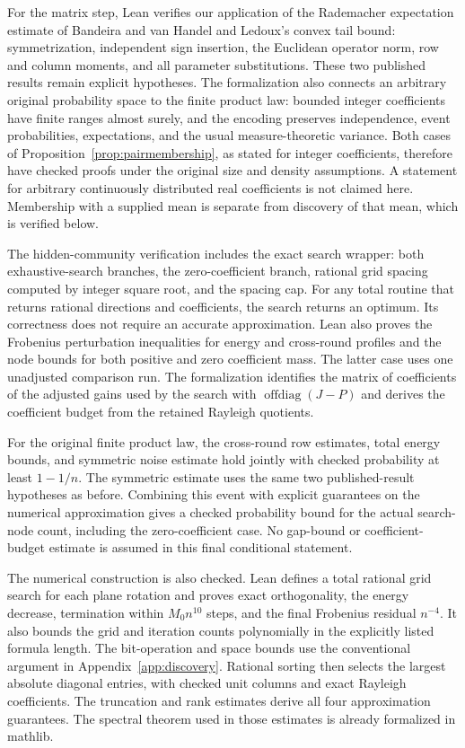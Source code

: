 \documentclass[11pt,a4paper]{article}
\theoremstyle{definition}
\theoremstyle{remark}
\begin{document}
For the matrix step, Lean verifies our application of the Rademacher
expectation estimate of Bandeira and van Handel and Ledoux's convex
tail bound: symmetrization, independent sign insertion, the Euclidean
operator norm, row and column moments, and all parameter substitutions.
These two published results remain explicit hypotheses. The formalization
also connects an arbitrary original probability space to the finite product
law: bounded integer coefficients have finite ranges almost surely, and
the encoding preserves independence, event probabilities, expectations,
and the usual measure-theoretic variance. Both cases of
Proposition~\ref{prop:pairmembership}, as stated for integer coefficients,
therefore have checked proofs under the original size and density
assumptions. A statement for arbitrary continuously distributed real
coefficients is not claimed here. Membership with a supplied mean is
separate from discovery of that mean, which is verified below.

The hidden-community verification includes the exact search wrapper:
both exhaustive-search branches, the zero-coefficient branch, rational grid
spacing computed by integer square root, and the spacing cap. For any total
routine that returns rational directions and coefficients, the search returns
an optimum. Its correctness does not require an accurate approximation.
Lean also proves the Frobenius perturbation inequalities for energy and
cross-round profiles and the node bounds for both positive and zero
coefficient mass. The latter case uses one unadjusted comparison run.
The formalization identifies the matrix of coefficients of the adjusted
gains used by the search with $\operatorname{offdiag}(J-P)$ and derives the coefficient budget from the
retained Rayleigh quotients.

For the original finite product law, the cross-round row estimates, total
energy bounds, and symmetric noise estimate hold jointly with checked
probability at least $1-1/n$. The symmetric estimate uses the same two
published-result hypotheses as before. Combining this event with explicit
guarantees on the numerical approximation gives a checked probability bound
for the actual search-node count, including the zero-coefficient case.
No gap-bound or coefficient-budget estimate is assumed in this final
conditional statement.

The numerical construction is also checked. Lean defines a total
rational grid search for each plane rotation and proves exact orthogonality,
the energy decrease, termination within $M_0n^{10}$ steps, and the final
Frobenius residual $n^{-4}$. It also bounds the grid and iteration counts
polynomially in the explicitly listed formula length. The bit-operation
and space bounds use the conventional argument in Appendix~\ref{app:discovery}.
Rational sorting then selects the largest absolute diagonal entries,
with checked unit columns and exact Rayleigh coefficients. The truncation
and rank estimates derive all four approximation guarantees. The spectral
theorem used in those estimates is already formalized in mathlib.
\end{document}
